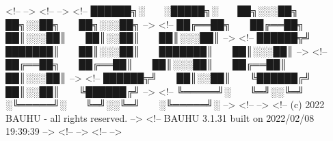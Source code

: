 
<!--                                                                  -->
<!--                                                                  -->
<!--        ██████╗░  ░█████╗░  ██╗░░░██╗  ██╗░░██╗  ██╗░░░██╗        -->
<!--        ██╔══██╗  ██╔══██╗  ██║░░░██║  ██║░░██║  ██║░░░██║        -->
<!--        ██████╦╝  ███████║  ██║░░░██║  ███████║  ██║░░░██║        -->
<!--        ██╔══██╗  ██╔══██║  ██║░░░██║  ██╔══██║  ██║░░░██║        -->
<!--        ██████╦╝  ██║░░██║  ╚██████╔╝  ██║░░██║  ╚██████╔╝        -->
<!--        ╚═════╝░  ╚═╝░░╚═╝  ░╚═════╝░  ╚═╝░░╚═╝  ░╚═════╝░        -->
<!--                                                                  -->
<!--            (c) 2022 BAUHU - all rights reserved.                 -->
<!--          BAUHU 3.1.31 built on 2022/02/08 19:39:39               -->
<!--                                                                  -->
<!--                                                                  -->
